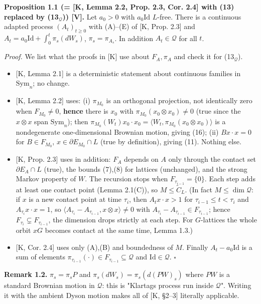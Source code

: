 \textbf{Proposition 1.1 (= {[}K, Lemma 2.2, Prop. 2.3, Cor. 2.4{]} with (13) replaced by (13\(_\mathcal Q\))) {[}V{]}.} Let \(a_0>0\) with \(a_0\mathrm{Id}\) \(L\)-free.
There is a continuous adapted process \((A_t)_{t\ge0}\) with (A)--(E) of {[}K, Prop. 2.3{]} and \(A_t=a_0\mathrm{Id}+\int_0^t\pi_s(dW_s)\), \(\pi_s=\pi_{A_s}\). In addition \(A_t\in\mathcal Q\) for all \(t\).

\emph{Proof.} We list what the proofs in {[}K{]} use about \(F_A,\pi_A\) and check it for (13\(_\mathcal Q\)).

\begin{itemize}
\tightlist
\item
  {[}K, Lemma 2.1{]} is a deterministic statement about continuous families in \(\mathrm{Sym}_n\); no change.
\item
  {[}K, Lemma 2.2{]} uses: (i) \(\pi_{M_0}\) is an orthogonal projection, not identically zero when \(F_{M_0}\ne0\), \textbf{hence} there is \(x_0\) with \(\pi_{M_0}(x_0\otimes x_0)\ne0\)
  (true since the \(x\otimes x\) span \(\mathrm{Sym}_n\)); then \(\pi_{M_0}(W_t)x_0\cdot x_0=\langle W_t,\pi_{M_0}(x_0\otimes x_0)\rangle\) is a nondegenerate one-dimensional Brownian
  motion, giving (16); (ii) \(Bx\cdot x=0\) for \(B\in F_{M_0}\), \(x\in\partial E_{M_0}\cap L\) (true by definition), giving (11). Nothing else.
\item
  {[}K, Prop. 2.3{]} uses in addition: \(F_A\) depends on \(A\) only through the contact set \(\partial E_A\cap L\) (true), the bounds (7),(8) for lattices (unchanged),
  and the strong Markov property of \(W\). The recursion stops when \(F_{\tau_{i-1}}=\{0\}\). Each step adds at least one contact point (Lemma 2.1(C)), so \(M\le\tilde C_L\).
  (In fact \(M\le\dim\mathcal Q\): if \(x\) is a new contact point at time \(\tau_i\), then \(A_tx\cdot x>1\) for \(\tau_{i-1}\le t<\tau_i\) and \(A_{\tau_i}x\cdot x=1\), so \(\langle A_{\tau_i}-A_{\tau_{i-1}},x\otimes x\rangle\ne0\) with \(A_{\tau_i}-A_{\tau_{i-1}}\in F_{\tau_{i-1}}\); hence \(F_{\tau_i}\subsetneq F_{\tau_{i-1}}\), the dimension drops strictly at each step. For \(G\)-lattices the whole orbit \(xG\) becomes contact at the same time, Lemma 1.3.)
\item
  {[}K, Cor. 2.4{]} uses only (A),(B) and boundedness of \(M\).
  Finally \(A_t-a_0\mathrm{Id}\) is a sum of elements \(\pi_{\tau_{i-1}}(\cdot)\in F_{\tau_{i-1}}\subseteq\mathcal Q\) and \(\mathrm{Id}\in\mathcal Q\). \(\square\)
\end{itemize}

\textbf{Remark 1.2.} \(\pi_s=\pi_sP\) and \(\pi_s(dW_s)=\pi_s(d(PW)_s)\) where \(PW\) is a standard Brownian motion in \(\mathcal Q\): this is "Klartag\textquotesingle s process run inside \(\mathcal Q\)".
Writing it with the ambient Dyson motion makes all of {[}K, §2--3{]} literally applicable.

